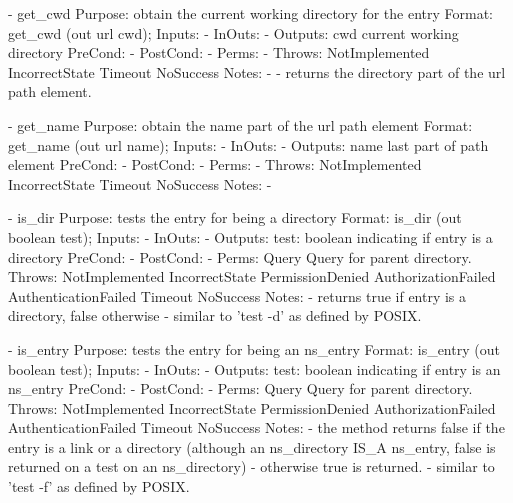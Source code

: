 \begin{myspec}
 
 
    - get_cwd
      Purpose:  obtain the current working directory for the
                entry
      Format:   get_cwd            (out url       cwd);
      Inputs:   -
      InOuts:   -
      Outputs:  cwd                 current working directory
      PreCond:  -
      PostCond: -
      Perms:    -
      Throws:   NotImplemented
                IncorrectState
                Timeout
                NoSuccess
      Notes:    -
                - returns the directory part of the url path
                  element.
 
 
 
    - get_name
      Purpose:  obtain the name part of the url path element
      Format:   get_name           (out  url       name);
      Inputs:   -
      InOuts:   -
      Outputs:  name                last part of path element
      PreCond:  -
      PostCond: -
      Perms:    -
      Throws:   NotImplemented
                IncorrectState
                Timeout
                NoSuccess
      Notes:    -
 
 
 
    - is_dir
      Purpose:  tests the entry for being a directory
      Format:   is_dir             (out boolean test);
      Inputs:   -
      InOuts:   -
      Outputs:  test:               boolean indicating if entry
                                    is a directory
      PreCond:  -
      PostCond: -
      Perms:    Query
                Query for parent directory.
      Throws:   NotImplemented
                IncorrectState
                PermissionDenied
                AuthorizationFailed
                AuthenticationFailed
                Timeout
                NoSuccess
      Notes:    - returns true if entry is a directory, false
                  otherwise
                - similar to 'test -d' as defined by POSIX.
 
 
    - is_entry
      Purpose:  tests the entry for being an ns_entry
      Format:   is_entry           (out boolean test);
      Inputs:   -
      InOuts:   -
      Outputs:  test:               boolean indicating if entry
                                    is an ns_entry
      PreCond:  -
      PostCond: -
      Perms:    Query
                Query for parent directory.
      Throws:   NotImplemented
                IncorrectState
                PermissionDenied
                AuthorizationFailed
                AuthenticationFailed
                Timeout
                NoSuccess
      Notes:    - the method returns false if the entry is a
                  link or a directory (although an ns_directory
                  IS_A ns_entry, false is returned on a test on 
                  an ns_directory) - otherwise true is returned.
                - similar to 'test -f' as defined by POSIX.
 

\end{myspec}
